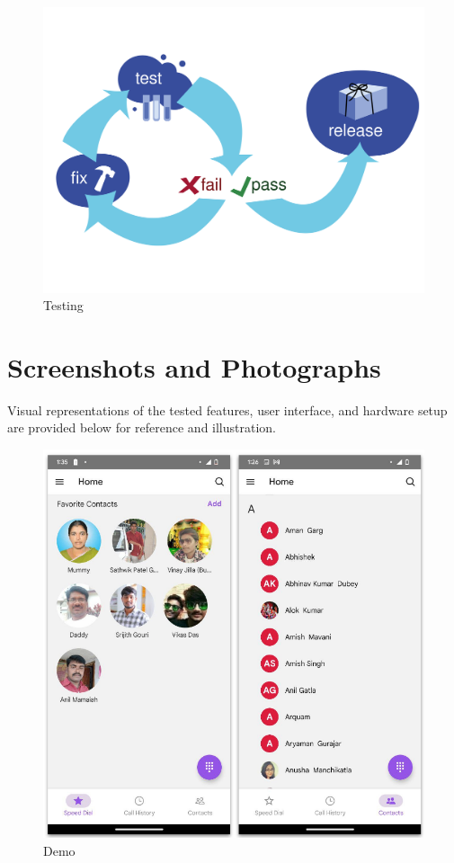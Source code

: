 \begin{figure}
    \centering
    \includegraphics[width=1\linewidth]{Media/Chapter 6/diagram_testing.png}
    \caption{Testing}
    \label{fig:Testing}
\end{figure}


\section{Screenshots and Photographs}

Visual representations of the tested features, user interface, and hardware setup are provided below for reference and illustration.

\begin{figure}
    \centering
    \includegraphics[width=1\linewidth]{Media//demo.png}
    \caption{Demo}
    \label{fig:App demo image}
\end{figure}


